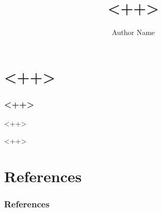 \documentclass{beamer}
\title{<++>}
\author{Author Name}
\institute{University Name}
\begin{document}
\begin{frame}

\maketitle

\end{frame}

\section{<++>}

\begin{frame}
\frametitle{<++>}

<++>


\end{frame}

<++>

\section{References}

\begin{frame}
\frametitle{References}
\printbibliography
\end{frame}
\end{document}
